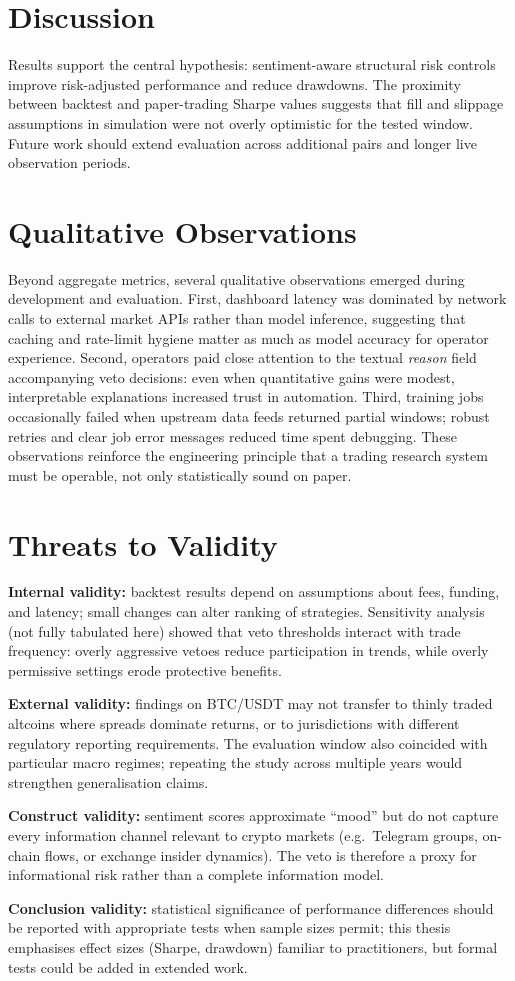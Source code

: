 \section{Discussion}
Results support the central hypothesis: sentiment-aware structural risk controls improve risk-adjusted performance and reduce drawdowns. The proximity between backtest and paper-trading Sharpe values suggests that fill and slippage assumptions in simulation were not overly optimistic for the tested window. Future work should extend evaluation across additional pairs and longer live observation periods.

\clearpage
\section{Qualitative Observations}
Beyond aggregate metrics, several qualitative observations emerged during development and evaluation. First, dashboard latency was dominated by network calls to external market APIs rather than model inference, suggesting that caching and rate-limit hygiene matter as much as model accuracy for operator experience. Second, operators paid close attention to the textual \emph{reason} field accompanying veto decisions: even when quantitative gains were modest, interpretable explanations increased trust in automation. Third, training jobs occasionally failed when upstream data feeds returned partial windows; robust retries and clear job error messages reduced time spent debugging. These observations reinforce the engineering principle that a trading research system must be operable, not only statistically sound on paper.

\section{Threats to Validity}
\textbf{Internal validity:} backtest results depend on assumptions about fees, funding, and latency; small changes can alter ranking of strategies. Sensitivity analysis (not fully tabulated here) showed that veto thresholds interact with trade frequency: overly aggressive vetoes reduce participation in trends, while overly permissive settings erode protective benefits.

\textbf{External validity:} findings on BTC/USDT may not transfer to thinly traded altcoins where spreads dominate returns, or to jurisdictions with different regulatory reporting requirements. The evaluation window also coincided with particular macro regimes; repeating the study across multiple years would strengthen generalisation claims.

\textbf{Construct validity:} sentiment scores approximate ``mood'' but do not capture every information channel relevant to crypto markets (e.g.\ Telegram groups, on-chain flows, or exchange insider dynamics). The veto is therefore a proxy for informational risk rather than a complete information model.

\textbf{Conclusion validity:} statistical significance of performance differences should be reported with appropriate tests when sample sizes permit; this thesis emphasises effect sizes (Sharpe, drawdown) familiar to practitioners, but formal tests could be added in extended work.
